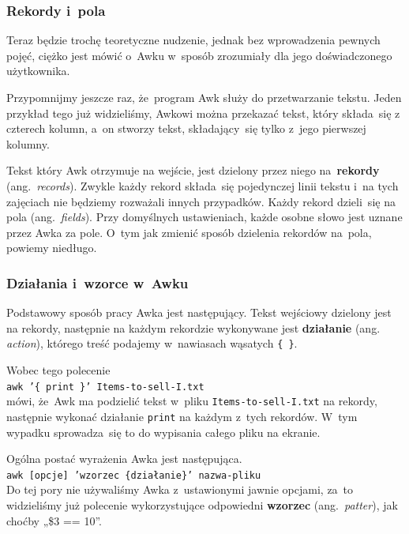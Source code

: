 \documentclass[10pt,t]{beamer}
\begin{document}
\begin{frame}
  \frametitle{Rekordy i~pola}


  Teraz będzie trochę teoretyczne nudzenie, jednak bez wprowadzenia
  pewnych pojęć, ciężko jest mówić o~Awku w~sposób zrozumiały dla jego
  doświadczonego użytkownika.

  Przypomnijmy jeszcze raz, że~program Awk służy do przetwarzanie tekstu.
  Jeden przykład tego już widzieliśmy, Awkowi można przekazać tekst,
  który składa~się z czterech kolumn, a~on stworzy tekst, składający~się
  tylko z~jego pierwszej kolumny.

  Tekst który Awk otrzymuje na wejście, jest dzielony przez niego
  na~\textbf{rekordy} (ang.~\textit{records}). Zwykle każdy rekord
  składa~się pojedynczej linii tekstu i~na tych zajęciach nie będziemy
  rozważali innych przypadków. Każdy rekord dzieli~się na pola
  (ang.~\textit{fields}). Przy domyślnych ustawieniach, każde osobne słowo
  jest uznane przez Awka za pole. O~tym jak zmienić sposób dzielenia
  rekordów na~pola, powiemy niedługo.

\end{frame}





\begin{frame}
  \frametitle{Działania i~wzorce w~Awku}


  Podstawowy sposób pracy Awka jest następujący. Tekst wejściowy dzielony
  jest na rekordy, następnie na każdym rekordzie wykonywane jest
  \textbf{działanie} (ang. \textit{action}), którego treść podajemy
  w~nawiasach wąsatych \texttt{\{ {} \}}.

  Wobec tego polecenie \\
  \texttt{awk '\{ print \}' Items-to-sell-I.txt} \\
  mówi, że~Awk ma podzielić tekst w~pliku \texttt{Items-to-sell-I.txt}
  na rekordy, następnie wykonać działanie \texttt{print} na każdym
  z~tych rekordów. W~tym wypadku sprowadza~się to do wypisania całego pliku
  na ekranie.

  Ogólna postać wyrażenia Awka jest następująca. \\
  \texttt{awk [opcje] 'wzorzec \{działanie\}' nazwa-pliku} \\
  Do tej pory nie używaliśmy Awka z~ustawionymi jawnie opcjami, za~to
  widzieliśmy już polecenie wykorzystujące odpowiedni \textbf{wzorzec}
  (ang.~\textit{patter}), jak choćby „\$3 == 10”.

\end{frame}
\end{document}

